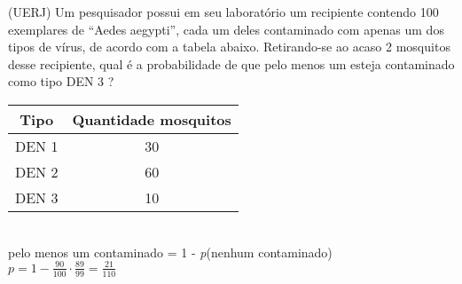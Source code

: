 \begin{ex}
(UERJ) Um pesquisador possui em seu laboratório um recipiente contendo 100 exemplares de “Aedes aegypti”, cada um deles contaminado com apenas um dos tipos de vírus, de acordo com a tabela abaixo. Retirando-se ao acaso 2 mosquitos desse recipiente, qual é a probabilidade de que pelo menos um esteja contaminado como tipo DEN 3 ?\\
\begin{center}
   \begin{tabular}{|c|c|} \hline
      Tipo   & Quantidade mosquitos \\  \hline
       DEN 1 &  30 \\  \hline
       DEN 2 &  60 \\  \hline
       DEN 3 &  10 \\  \hline
   \end{tabular}
\end{center}
 \begin{sol}
  \phantom{A} \\
  pelo menos um contaminado = 1 - \textit{p}(nenhum contaminado) \\
  $p=1-\frac{90}{100}\cdot\frac{89}{99}=\frac{21}{110}$
 \end{sol}
\end{ex}